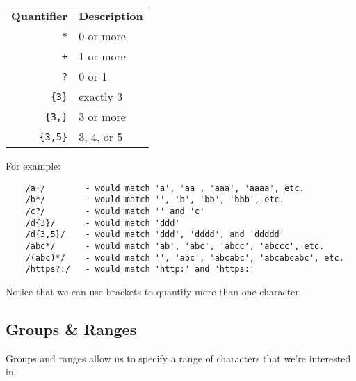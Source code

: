 \begin{center}
    \begin{small}
        \begin{tabularx}{\textwidth}{r l}
            \textbf{Quantifier}   & \textbf{Description} \\
            \texttt{*}          & 0 or more \\
            \texttt{+}          & 1 or more \\
            \texttt{?}          & 0 or 1 \\
            \texttt{\{3\}}      & exactly 3 \\
            \texttt{\{3,\}}     & 3 or more \\
            \texttt{\{3,5\}}   & 3, 4, or 5
        \end{tabularx}
    \end{small}
\end{center}

For example:

\begin{verbatim}
    /a+/        - would match 'a', 'aa', 'aaa', 'aaaa', etc.
    /b*/        - would match '', 'b', 'bb', 'bbb', etc.
    /c?/        - would match '' and 'c'
    /d{3}/      - would match 'ddd'
    /d{3,5}/    - would match 'ddd', 'dddd', and 'ddddd'
    /abc*/      - would match 'ab', 'abc', 'abcc', 'abccc', etc.
    /(abc)*/    - would match '', 'abc', 'abcabc', 'abcabcabc', etc.
    /https?:/   - would match 'http:' and 'https:'
\end{verbatim}

Notice that we can use brackets to quantify more than one character.

\pagebreak

\subsection{Groups \& Ranges}

Groups and ranges allow us to specify a range of characters that we're interested in.

